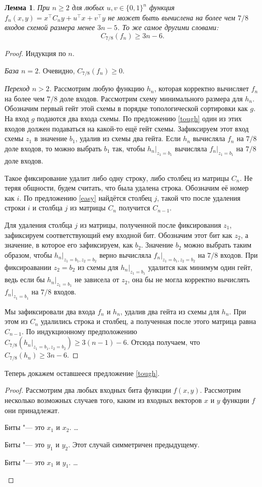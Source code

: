 \documentclass[oneside, a4paper]{article}
\newtheorem{lemma}{Лемма}
\begin{document}
\begin{lemma}
При $n \geq 2$ для любых $u, v \in \{0, 1\}^n$ функция $f_n(x, y) = x^\top C_n y + u^\top x + v^\top y$
не может быть вычислена на более чем $7/8$ входов схемой размера менее $3n - 5$. То же
самое другими словами:
\[
C_{7/8}(f_n) \geq 3n - 6.
\]
\end{lemma}
\begin{proof}
Индукция по $n$.

\emph{База $n = 2$}. Очевидно, $C_{7/8}(f_n) \geq 0$.

\emph{Переход $n > 2$.} Рассмотрим любую функцию $h_n$, которая корректно
вычисляет $f_n$ на более чем $7/8$ доле входов. Рассмотрим схему минимального
размера для $h_n$. Обозначим первый гейт этой схемы в порядке топологической
сортировки как $g$. На вход $g$ подаются два входа схемы. По предложению \ref{tough}
один из этих входов должен подаваться на какой-то ещё гейт схемы. Зафиксируем
этот вход схемы $z_1$ в значение $b_1$, удалив из схемы два гейта. Если $h_n$
вычисляла $f_n$ на $7/8$ доле входов, то можно выбрать $b_1$ так, чтобы
$h_n \rvert_{z_1 = b_1}$ вычисляла $f_n \rvert_{z_1 = b_1}$ на $7/8$ доле входов.

Такое фиксирование удалит либо одну строку, либо столбец из матрицы $C_n$. Не
теряя общности, будем считать, что была удалена строка. Обозначим её номер как
$i$. По предложению \ref{easy} найдётся столбец $j$, такой что после удаления
строки $i$ и столбца $j$ из матрицы $C_n$ получится $C_{n-1}$.

Для удаления столбца $j$ из матрицы, полученной после фиксирования $z_1$,
зафиксируем соответствующий ему входной бит. Обозначим этот бит как $z_2$, а
значение, в которое его зафиксируем, как $b_2$. Значение $b_2$ можно выбрать
таким образом, чтобы $h_n \rvert _ {z_1 = b_1, z_2 = b_2}$ верно вычисляла
$f_n \rvert _ {z_1 = b_1, z_2 = b_2}$ на $7/8$ входов. При фиксироавании
$z_2 = b_2$ из схемы для $h_n \rvert _ {z_1 = b_1}$ удалится как минимум один
гейт, ведь если бы $h_n \rvert _ {z_1 = b_1}$ не зависела от $z_2$, она бы не
могла корректно вычислять $f_n \rvert _ {z_1 = b_1}$ на $7/8$ входов.

Мы зафиксировали два входа $f_n$ и $h_n$, удалив два гейта из схемы для $h_n$.
При этом из $C_n$ удалились строка и столбец, а полученная после этого матрица
равна $C_{n-1}$. По индукционному предположению $C_{7/8}(h_n \rvert _ {z_1 = b_1,
z_2 = b_2}) \geq 3(n-1) - 6$. Отсюда получаем, что $C_{7/8}(h_n) \geq 3n - 6$.
\end{proof}

Теперь докажем оставшееся предложение \ref{tough}.

\begin{proof}
Рассмотрим два любых входных бита функции $f(x, y)$. Рассмотрим несколько
возможных случаев того, каким из входных векторов $x$ и $y$ функции $f$ они
принадлежат.
\begin{description}
\item{Биты "--- это $x_1$ и $x_2$.} \dots
\item{Биты "--- это $y_1$ и $y_2$.} Этот случай симметричен предыдущему.
\item{Биты "--- это $x_1$ и $y_1$.} \dots
\end{description}
\end{proof}
\end{document}
